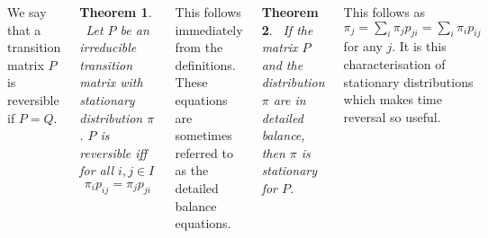 \documentclass{tikzposter} %
\newtheorem{theorem}{Theorem}
\begin{document}
\begin{columns}
{{  We say that a transition matrix $P$ is reversible if $P = Q$. \\

  \begin{theorem}
    \ Let $P$ be an irreducible transition matrix with stationary distribution $\pi$. $P$ is reversible iff for all $i, j \in I$
    \begin{align*}
      \pi_{i} p_{ij} = \pi_{j}p_{ji}
    \end{align*}
  \end{theorem}
  \hphantom{}

  This follows immediately from the definitions. These equations are sometimes referred to as the detailed balance equations.\\

  \begin{theorem}
  \ If the matrix $P$ and the distribution $\pi$ are in detailed balance, then $\pi$ is stationary for $P$.
  \end{theorem}
  \hphantom{}

  This follows as $\pi_{j} = \sum_{i} \pi_{j}p_{ji} = \sum_{i} \pi_{i} p_{ij}$ for any $j$. It is this characterisation of stationary distributions which makes time reversal so useful.
}
}
\end{columns}
\end{document}
